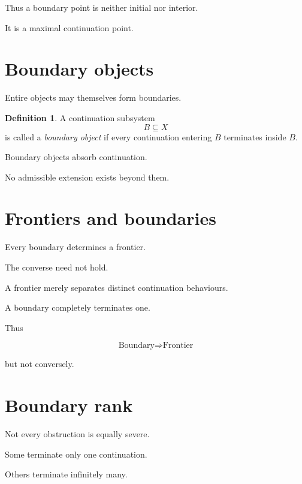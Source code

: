 \documentclass[13pt,openany]{book}
\theoremstyle{plain}
\theoremstyle{definition}
\newtheorem{definition}{Definition}[chapter]
\begin{document}
Thus a boundary point is neither initial nor interior.

It is a maximal continuation point.

\section{Boundary objects}

Entire objects may themselves form boundaries.

\begin{definition}
A continuation subsystem
\[
B\subseteq X
\]
is called a \emph{boundary object} if every continuation entering $B$ terminates inside $B$.
\end{definition}

Boundary objects absorb continuation.

No admissible extension exists beyond them.

\section{Frontiers and boundaries}

Every boundary determines a frontier.

The converse need not hold.

A frontier merely separates distinct continuation behaviours.

A boundary completely terminates one.

Thus

\[
\text{Boundary}
\Longrightarrow
\text{Frontier}
\]

but not conversely.

\section{Boundary rank}

Not every obstruction is equally severe.

Some terminate only one continuation.

Others terminate infinitely many.
\end{document}
